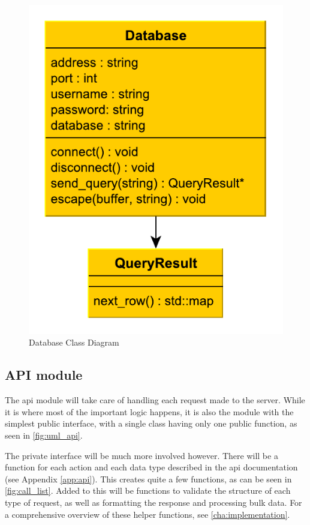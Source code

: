 \begin{figure}[ht]
\begin{center}
\includegraphics[scale=0.6]{img/database.pdf}
\caption{Database Class Diagram}
\label{fig:uml_database}
\end{center}
\end{figure}

\subsection{API module}

The \ac{api} module will take care of handling each request made to the server. While it is where most of the important logic happens, it is also the module with the simplest public interface, with a single class having only one public function, as seen in \autoref{fig:uml_api}.

The private interface will be much more involved however. There will be a function for each action and each data type described in the \ac{api} documentation (see Appendix \ref{app:api}).
This creates quite a few functions, as can be seen in \autoref{fig:call_list}. Added to this will be functions to validate the structure of each type of request, as well as formatting the response and processing bulk data.
For a comprehensive overview of these helper functions, see \autoref{cha:implementation}.

